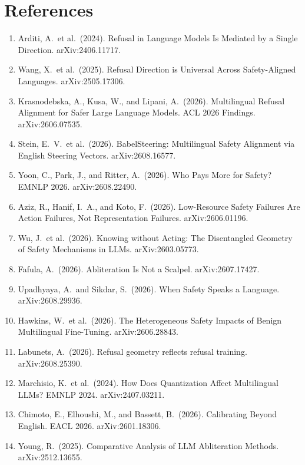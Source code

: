 \documentclass[11pt,letterpaper]{article}
\begin{document}
\section{References}\label{sec:references}

\begin{enumerate}
\item[{[1]}] Arditi, A.\ et al.\ (2024). Refusal in Language Models Is Mediated by a Single Direction. arXiv:2406.11717.
\item[{[2]}] Wang, X.\ et al.\ (2025). Refusal Direction is Universal Across Safety-Aligned Languages. arXiv:2505.17306.
\item[{[3]}] Krasnodebska, A., Kusa, W., and Lipani, A.\ (2026). Multilingual Refusal Alignment for Safer Large Language Models. ACL 2026 Findings. arXiv:2606.07535.
\item[{[4]}] Stein, E.~V.\ et al.\ (2026). BabelSteering: Multilingual Safety Alignment via English Steering Vectors. arXiv:2608.16577.
\item[{[5]}] Yoon, C., Park, J., and Ritter, A.\ (2026). Who Pays More for Safety? EMNLP 2026. arXiv:2608.22490.
\item[{[6]}] Aziz, R., Hanif, I.~A., and Koto, F.\ (2026). Low-Resource Safety Failures Are Action Failures, Not Representation Failures. arXiv:2606.01196.
\item[{[7]}] Wu, J.\ et al.\ (2026). Knowing without Acting: The Disentangled Geometry of Safety Mechanisms in LLMs. arXiv:2603.05773.
\item[{[8]}] Fafula, A.\ (2026). Abliteration Is Not a Scalpel. arXiv:2607.17427.
\item[{[9]}] Upadhyaya, A.\ and Sikdar, S.\ (2026). When Safety Speaks a Language. arXiv:2608.29936.
\item[{[10]}] Hawkins, W.\ et al.\ (2026). The Heterogeneous Safety Impacts of Benign Multilingual Fine-Tuning. arXiv:2606.28843.
\item[{[11]}] Labunets, A.\ (2026). Refusal geometry reflects refusal training. arXiv:2608.25390.
\item[{[12]}] Marchisio, K.\ et al.\ (2024). How Does Quantization Affect Multilingual LLMs? EMNLP 2024. arXiv:2407.03211.
\item[{[13]}] Chimoto, E., Elhoushi, M., and Bassett, B.\ (2026). Calibrating Beyond English. EACL 2026. arXiv:2601.18306.
\item[{[14]}] Young, R.\ (2025). Comparative Analysis of LLM Abliteration Methods. arXiv:2512.13655.

\end{enumerate}
\end{document}
